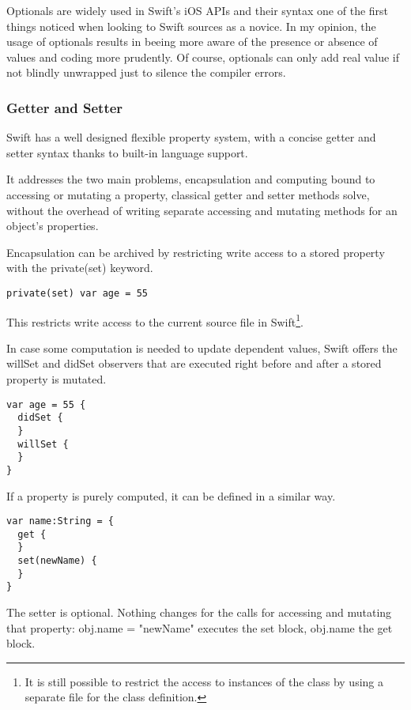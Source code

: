 Optionals are widely used in Swift's iOS APIs and their syntax one of the first things noticed when looking to Swift sources as a novice.  
In my opinion, the usage of optionals results in beeing more aware of the presence or absence of values and coding more prudently. Of course, optionals can only add real value if not blindly unwrapped just to silence the compiler errors.  


\subsubsection{Getter and Setter}

Swift has a well designed flexible property system, with a concise getter and setter syntax thanks to built-in language support. 

It addresses the two main problems, encapsulation and computing bound to accessing or mutating a property, classical getter and setter methods solve, without the overhead of writing separate accessing and mutating methods for an object's properties.

Encapsulation can be archived by restricting write access to a stored property with the private(set) keyword.

\begin{lstlisting}[frame=none]
private(set) var age = 55
\end{lstlisting}

This restricts write access to the current source file in Swift\footnote{It is still possible to restrict the access to instances of the class by using a separate file for the class definition.}.

In case some computation is needed to update dependent values, Swift offers the willSet and didSet observers that are executed right before and after a stored property is mutated.

\begin{lstlisting}[frame=none]
var age = 55 {
  didSet {
  }
  willSet {
  }
}
\end{lstlisting}

If a property is purely computed, it can be defined in a similar way.

\begin{lstlisting}[frame=none]
var name:String = {
  get {
  }
  set(newName) {
  }
}
\end{lstlisting}

The setter is optional. Nothing changes for the calls for accessing and mutating that property: obj.name = "newName" executes the set block, obj.name the get block.

